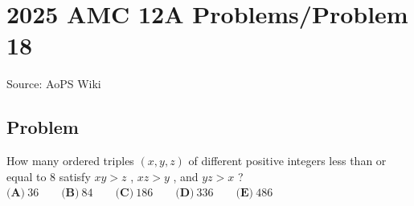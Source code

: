 \documentclass[12pt]{article}
\begin{document}
\section*{{2025 AMC 12A Problems/Problem 18}}
Source: AoPS Wiki

\subsection*{Problem}
How many ordered triples $(x, y, z)$ of different positive integers less than or equal to $8$ satisfy $xy > z$ , $xz > y$ , and $yz > x$ ? $\textbf{(A)}~36 \qquad \textbf{(B)}~84 \qquad \textbf{(C)}~186 \qquad \textbf{(D)}~336 \qquad \textbf{(E)}~486$
\end{document}
